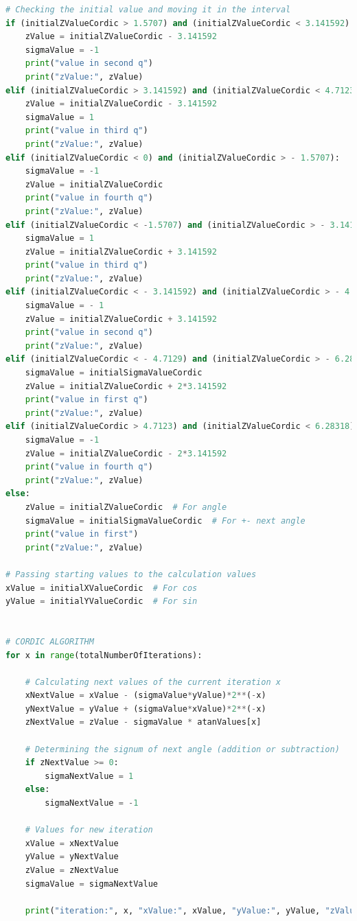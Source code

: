 \documentclass[a4paper, twoside, 11pt]{article}
\begin{document}
\begin{lstlisting}[language={python}, caption={Python code of \gls{abbreviation:cordic} implementation.}, label= {lst:python-cordic}]
# Checking the initial value and moving it in the interval
if (initialZValueCordic > 1.5707) and (initialZValueCordic < 3.141592):
    zValue = initialZValueCordic - 3.141592
    sigmaValue = -1
    print("value in second q")
    print("zValue:", zValue)
elif (initialZValueCordic > 3.141592) and (initialZValueCordic < 4.7123):
    zValue = initialZValueCordic - 3.141592
    sigmaValue = 1
    print("value in third q")
    print("zValue:", zValue)
elif (initialZValueCordic < 0) and (initialZValueCordic > - 1.5707):
    sigmaValue = -1
    zValue = initialZValueCordic
    print("value in fourth q")
    print("zValue:", zValue)
elif (initialZValueCordic < -1.5707) and (initialZValueCordic > - 3.141592):
    sigmaValue = 1
    zValue = initialZValueCordic + 3.141592
    print("value in third q")
    print("zValue:", zValue)
elif (initialZValueCordic < - 3.141592) and (initialZValueCordic > - 4.7129):
    sigmaValue = - 1
    zValue = initialZValueCordic + 3.141592
    print("value in second q")
    print("zValue:", zValue)
elif (initialZValueCordic < - 4.7129) and (initialZValueCordic > - 6.28318):
    sigmaValue = initialSigmaValueCordic
    zValue = initialZValueCordic + 2*3.141592
    print("value in first q")
    print("zValue:", zValue)
elif (initialZValueCordic > 4.7123) and (initialZValueCordic < 6.28318):
    sigmaValue = -1
    zValue = initialZValueCordic - 2*3.141592
    print("value in fourth q")
    print("zValue:", zValue)
else:
    zValue = initialZValueCordic  # For angle
    sigmaValue = initialSigmaValueCordic  # For +- next angle
    print("value in first")
    print("zValue:", zValue)

# Passing starting values to the calculation values
xValue = initialXValueCordic  # For cos
yValue = initialYValueCordic  # For sin


# CORDIC ALGORITHM
for x in range(totalNumberOfIterations):

    # Calculating next values of the current iteration x
    xNextValue = xValue - (sigmaValue*yValue)*2**(-x)
    yNextValue = yValue + (sigmaValue*xValue)*2**(-x)
    zNextValue = zValue - sigmaValue * atanValues[x]

    # Determining the signum of next angle (addition or subtraction)
    if zNextValue >= 0:
        sigmaNextValue = 1
    else:
        sigmaNextValue = -1

    # Values for new iteration
    xValue = xNextValue
    yValue = yNextValue
    zValue = zNextValue
    sigmaValue = sigmaNextValue

    print("iteration:", x, "xValue:", xValue, "yValue:", yValue, "zValue:", zValue, "sigmaValue:", sigmaValue, "\n")


\end{lstlisting}
\end{document}
